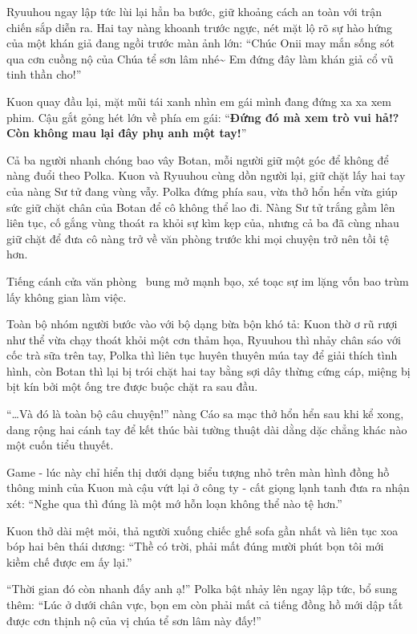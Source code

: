 \documentclass[../main.tex]{subfiles}
\begin{document}
Ryuuhou ngay lập tức lùi lại hẳn ba bước, giữ khoảng cách an toàn với trận chiến sắp diễn ra. Hai tay nàng khoanh trước ngực, nét mặt lộ rõ sự hào hứng của một khán giả đang ngồi trước màn ảnh lớn: ``Chúc Onii may mắn sống sót qua cơn cuồng nộ của Chúa tể sơn lâm nhé\~{} Em đứng đây làm khán giả cổ vũ tinh thần cho!''

Kuon quay đầu lại, mặt mũi tái xanh nhìn em gái mình đang đứng xa xa xem phim. Cậu gắt gỏng hét lớn về phía em gái: ``\textbf{Đứng đó mà xem trò vui hả!? Còn không mau lại đây phụ anh một tay!}''

Cả ba người nhanh chóng bao vây Botan, mỗi người giữ một góc để không để nàng đuổi theo Polka. Kuon và Ryuuhou cùng dồn người lại, giữ chặt lấy hai tay của nàng Sư tử đang vùng vẫy. Polka đứng phía sau, vừa thở hổn hển vừa giúp sức giữ chặt chân của Botan để cô không thể lao đi. Nàng Sư tử trắng gầm lên liên tục, cố gắng vùng thoát ra khỏi sự kìm kẹp của, nhưng cả ba đã cùng nhau giữ chặt để đưa cô nàng trở về văn phòng trước khi mọi chuyện trở nên tồi tệ hơn.

\ct

Tiếng cánh cửa văn phòng \hll\ bung mở mạnh bạo, xé toạc sự im lặng vốn bao trùm lấy không gian làm việc.

Toàn bộ nhóm người bước vào với bộ dạng bừa bộn khó tả: Kuon thờ ơ rũ rượi như thể vừa chạy thoát khỏi một cơn thảm họa, Ryuuhou thì nhảy chân sáo với cốc trà sữa trên tay, Polka thì liên tục huyên thuyên múa tay để giải thích tình hình, còn Botan thì lại bị trói chặt hai tay bằng sợi dây thừng cứng cáp, miệng bị bịt kín bởi một ống tre được buộc chặt ra sau đầu.


``\dots Và đó là toàn bộ câu chuyện!'' nàng Cáo sa mạc thở hổn hển sau khi kể xong, dang rộng hai cánh tay để kết thúc bài tường thuật dài dằng dặc chẳng khác nào một cuốn tiểu thuyết.

Game - lúc này chỉ hiển thị dưới dạng biểu tượng nhỏ trên màn hình đồng hồ thông minh của Kuon mà cậu vứt lại ở công ty - cất giọng lạnh tanh đưa ra nhận xét: ``Nghe qua thì đúng là một mớ hỗn loạn không thể nào tệ hơn.''

Kuon thở dài mệt mỏi, thả người xuống chiếc ghế sofa gần nhất và liên tục xoa bóp hai bên thái dương: ``Thề có trời, phải mất đúng mười phút bọn tôi mới kiềm chế được em ấy lại.''

``Thời gian đó còn nhanh đấy anh ạ!'' Polka bật nhảy lên ngay lập tức, bổ sung thêm: ``Lúc ở dưới chân vực, bọn em còn phải mất cả tiếng đồng hồ mới dập tắt được cơn thịnh nộ của vị chúa tể sơn lâm này đấy!''
\end{document}
